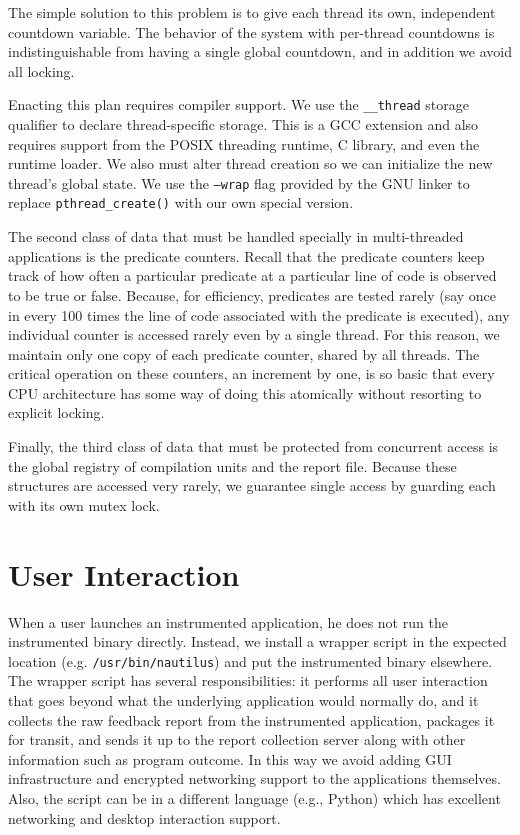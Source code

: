 \documentclass[times,10pt,twocolumn]{article}
\begin{document}
The simple solution to this problem is to give each thread its own,
independent countdown variable.  The behavior of the system with per-thread
countdowns is indistinguishable from having a single global countdown,
and in addition we avoid all locking.

Enacting this plan requires compiler support.  We use the
\texttt{\_\_thread} storage qualifier to declare thread-specific
storage.  This is a GCC extension and also requires support from the
POSIX threading runtime, C library, and even the runtime loader.  
We also must alter thread creation so we can initialize the
new thread's global state.  We use the \texttt{--wrap} flag provided
by the GNU linker to replace \texttt{pthread\_create()} with our own
special version.  

The second class of data that must be handled specially in
multi-threaded applications is the predicate counters.  Recall that
the predicate counters keep track of how often a particular predicate
at a particular line of code is observed to be true or false.
Because, for efficiency, predicates are tested rarely (say once in
every 100 times the line of code associated with the predicate is
executed), any individual counter is accessed rarely even by a single
thread.  For this reason, we maintain only one copy of each predicate
counter, shared by all threads.  The critical operation on these
counters, an increment by one, is so basic that every CPU architecture
has some way of doing this atomically without resorting to explicit
locking.

Finally, the third class of data that must be protected from concurrent access
is the global registry of compilation units and the report file.
Because these structures are accessed very rarely, we guarantee single 
access by guarding each with its own mutex lock.


\section{User Interaction}

When a user launches an instrumented application, he does not run the
instrumented binary directly.  Instead, we install a wrapper script in
the expected location (e.g. \texttt{/usr/bin/nautilus}) and put the
instrumented binary elsewhere.  The wrapper script has several
responsibilities:  it performs all user interaction
that goes beyond what the underlying application would normally do, and
it collects the raw feedback report from the instrumented
application, packages it for transit, and sends it up to the report
collection server along with other information such as program
outcome.  In this way we avoid adding GUI infrastructure and
encrypted networking support to the applications themselves.
Also, the script can be in a different language (e.g., Python)
which has excellent networking and desktop interaction support.
\end{document}
